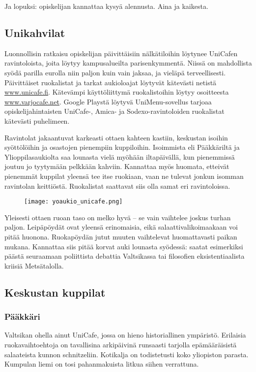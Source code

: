 \documentclass[../ala_hataile.tex]{subfiles}
\begin{document}
Ja lopuksi: opiskelijan kannattaa kysyä
alennusta. Aina ja kaikesta.

\subsection*{Unikahvilat}
Luonnollisin ratkaisu opiskelijan päivittäisiin
nälkätiloihin löytynee UniCafen
ravintoloista, joita löytyy kampusalueilta
parisenkymmentä. Niissä on mahdollista
syödä parilla eurolla niin paljon kuin vain
jaksaa, ja vieläpä terveellisesti. Päivittäiset
ruokalistat ja tarkat aukioloajat löytyvät kätevästi
netistä \url{www.unicafe.fi}. Kätevämpi
käyttöliittymä ruokalistoihin löytyy osoitteesta
\url{www.varjocafe.net}. Google Playstä löytyvä UniMenu-sovellus tarjoaa opiskelijahintaisten \mbox{UniCafe-}, Amica- ja Sodexo-ravintoloiden ruokalistat kätevästi puhelimeen.

Ravintolat jakaantuvat karkeasti ottaen
kahteen kastiin, keskustan isoihin syöttölöihin
ja osastojen pienempiin kuppiloihin.
Isoimmista eli Pääkkäriltä ja Ylioppilasaukiolta
saa lounasta vielä myöhään iltapäivällä,
kun pienemmissä joutuu jo tyytymään
pelkkään kahviin. Kannattaa myös
huomata, etteivät pienemmät kuppilat
yleensä tee itse ruokiaan, vaan ne tulevat
jonkun isomman ravintolan keittiöstä. Ruokalistat
saattavat siis olla samat eri ravintoloissa.
\begin{figure}[!b]
	\centering
	\texttt{[image: yoaukio\_unicafe.png]}
\end{figure}

Yleisesti ottaen ruoan taso on melko
hyvä -- se vain vaihtelee joskus turhan paljon.
Leipäpöydät ovat yleensä erinomaisia,
eikä salaattivalikoimaakaan voi pitää huonona.
Ruokapöydän jutut muuten vaihtelevat
huomattavasti paikan mukana. Kannattaa
siis pitää korvat auki lounasta syödessä:
saatat esimerkiksi päästä seuraamaan poliittista
debattia Valtsikassa tai filosofien
eksistentiaalista kriisiä Metsätalolla.
\subsection*{Keskustan kuppilat}
\subsubsection*{Pääkkäri}
Valtsikan ohella ainut UniCafe, jossa
on hieno historiallinen ympäristö. Erilaisia
ruokavaihtoehtoja on tavallisina arkipäivinä
runsaasti tarjolla epämääräisistä salaateista
kunnon schnitzeliin. Kotikalja on
todistetusti koko yliopiston parasta. Kumpulan
liemi on tosi pahanmakuista litkua
siihen verrattuna. 
\end{document}

